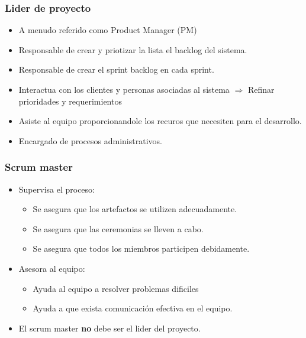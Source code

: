 \documentclass{beamer}
\begin{document}
\begin{frame}
    \frametitle{Lider de proyecto}
    \begin{itemize}
        \item{A menudo referido como Product Manager (PM)}
        \item{Responsable de crear y priotizar la lista el backlog del sistema.}
        \item{Responsable de crear el sprint backlog en cada sprint.}
        \item{Interactua con los clientes y personas asociadas al sistema $\Rightarrow$ Refinar prioridades y requerimientos}
        \item{Asiste al equipo proporcionandole los recuros que necesiten para el desarrollo.}
        \item{Encargado de procesos administrativos.}
    \end{itemize}
\end{frame}

\begin{frame}
    \frametitle{Scrum master}
    \begin{itemize}
        \item{Supervisa el proceso:
            \begin{itemize}
                \item{Se asegura que los artefactos se utilizen adecuadamente.}
                \item{Se asegura que las ceremonias se lleven a cabo.}
                \item{Se asegura que todos los miembros participen debidamente.}
            \end{itemize}
        }
        \item{Asesora al equipo:
            \begin{itemize}
                \item{Ayuda al equipo a resolver problemas dificiles}
                \item{Ayuda a que exista comunicaci\'on efectiva en el equipo.}
            \end{itemize}
        }
        \item{El scrum master {\bf no} debe ser el lider del proyecto.}
    \end{itemize}
\end{frame}
\end{document}

